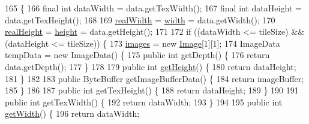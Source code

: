 \begin{DoxyCode}
165                                                                                                            
        \{
166         \textcolor{keyword}{final} \textcolor{keywordtype}{int} dataWidth = data.getTexWidth();
167         \textcolor{keyword}{final} \textcolor{keywordtype}{int} dataHeight = data.getTexHeight();
168         
169         \mbox{\hyperlink{classorg_1_1newdawn_1_1slick_1_1_big_image_af37ee66244f573122b1b87b4f03e2ac0}{realWidth}} = \mbox{\hyperlink{classorg_1_1newdawn_1_1slick_1_1_image_a7d02c85e21b388428cfe5cc5c82714a1}{width}} = data.getWidth();
170         \mbox{\hyperlink{classorg_1_1newdawn_1_1slick_1_1_big_image_a4a9f1e4248d72ff16ea9e0abe7902685}{realHeight}} = \mbox{\hyperlink{classorg_1_1newdawn_1_1slick_1_1_image_a54397a37823bc59ddc79ec70dc5cf226}{height}} = data.getHeight();
171         
172         \textcolor{keywordflow}{if} ((dataWidth <= tileSize) && (dataHeight <= tileSize)) \{
173             \mbox{\hyperlink{classorg_1_1newdawn_1_1slick_1_1_big_image_a297fc524b2aef82e75e23a59c6f4102f}{images}} = \textcolor{keyword}{new} \mbox{\hyperlink{classorg_1_1newdawn_1_1slick_1_1_image_a2c047fa669a8387f6c2d9bde33b3ee04}{Image}}[1][1];
174             ImageData tempData = \textcolor{keyword}{new} ImageData() \{
175                 \textcolor{keyword}{public} \textcolor{keywordtype}{int} getDepth() \{
176                     \textcolor{keywordflow}{return} data.getDepth();
177                 \}
178 
179                 \textcolor{keyword}{public} \textcolor{keywordtype}{int} \mbox{\hyperlink{classorg_1_1newdawn_1_1slick_1_1_image_aa2594a93f5126f60ad8a72444fceee98}{getHeight}}() \{
180                     \textcolor{keywordflow}{return} dataHeight;
181                 \}
182 
183                 \textcolor{keyword}{public} ByteBuffer getImageBufferData() \{
184                     \textcolor{keywordflow}{return} imageBuffer;
185                 \}
186 
187                 \textcolor{keyword}{public} \textcolor{keywordtype}{int} getTexHeight() \{
188                     \textcolor{keywordflow}{return} dataHeight;
189                 \}
190 
191                 \textcolor{keyword}{public} \textcolor{keywordtype}{int} getTexWidth() \{
192                     \textcolor{keywordflow}{return} dataWidth;
193                 \}
194 
195                 \textcolor{keyword}{public} \textcolor{keywordtype}{int} \mbox{\hyperlink{classorg_1_1newdawn_1_1slick_1_1_image_a94a5d32276e8a27930480223c5d69e11}{getWidth}}() \{
196                     \textcolor{keywordflow}{return} dataWidth;

\end{DoxyCode}

